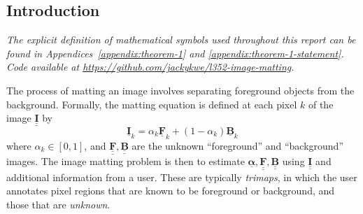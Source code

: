 \documentclass{article}
\theoremstyle{definition}
\def\vt#1{\underline{\mathbf{#1}}}
\def\vts#1{\underline{\boldsymbol{#1}}}
\def\mt#1{\underline{\underline{\mathbf{#1}}}}
\begin{document}
\begin{multicols}{2}[]




\section{Introduction}

\emph{The explicit definition of mathematical symbols used throughout this report can be found in Appendices~\ref{appendix:theorem-1} and \ref{appendix:theorem-1-statement}. Code available at \url{https://github.com/jackykwe/l352-image-matting}.}

The process of matting an image involves separating foreground objects from the background. Formally, the matting equation is defined at each pixel $k$ of the image $\mt I$ by $$\vt I_k = \alpha_{k} \vt F_{k}  + (1-\alpha_k) \vt B_k$$
where $\alpha_{k}\in[0,1]$, and $\mt F, \mt B$ are the unknown ``foreground'' and ``background'' images.   %
The image matting problem is then to estimate $\vts \alpha, \mt F, \mt B$ using $\mt I$ and additional information from a user. These are typically \emph{trimaps}, in which the user annotates pixel regions that are known to be foreground or background, and those that are \emph{unknown}.  %


\end{multicols}
\end{document}
